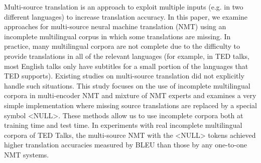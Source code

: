 Multi-source translation is an approach to exploit multiple inputs (e.g. in two different languages) to increase translation accuracy. In this paper, we examine approaches for multi-source neural machine translation (NMT) using an incomplete multilingual corpus in which some translations are missing. In practice, many multilingual corpora are not complete due to the difficulty to provide translations in all of the relevant languages (for example, in TED talks, most English talks only have subtitles for a small portion of the languages that TED supports). Existing studies on multi-source translation did not explicitly handle such situations. This study focuses on the use of incomplete multilingual corpora in multi-encoder NMT and mixture of NMT experts and examines a very simple implementation where missing source translations are replaced by a special symbol <NULL>. These methods allow us to use incomplete corpora both at training time and test time. In experiments with real incomplete multilingual corpora of TED Talks, the multi-source NMT with the <NULL> tokens achieved higher translation accuracies measured by BLEU than those by any one-to-one NMT systems.
